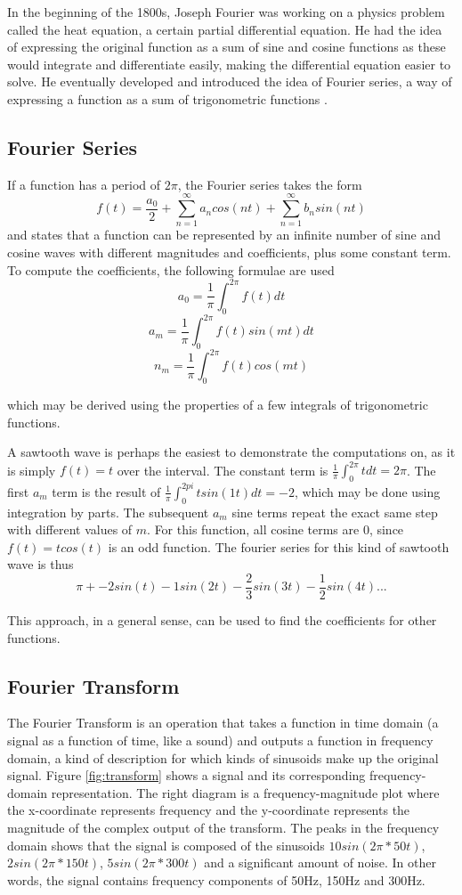 In the beginning of the 1800s, Joseph Fourier was working on a physics problem called the heat equation, a certain partial differential equation. He had the idea of expressing the original function as a sum of sine and cosine functions as these would integrate and differentiate easily, making the differential equation easier to solve. He eventually developed and introduced the idea of Fourier series, a way of expressing a function as a sum of trigonometric functions \cite{Bounchaleun2019}.

\subsection{Fourier Series} 
If a function has a period of $2\pi$, the Fourier series takes the form $$f(t) = \frac{a_0}{2} + \sum_{n=1}^{\infty}a_ncos(nt)+\sum_{n=1}^{\infty}b_nsin(nt)$$ and states that a function can be represented by an infinite number of sine and cosine waves with different magnitudes and coefficients, plus some constant term. To compute the coefficients, the following formulae are used
$$a_0 = \frac{1}{\pi}\int_0^{2\pi} f(t)dt$$
$$a_m = \frac{1}{\pi}\int_0^{2\pi} f(t) sin(mt)dt$$
$$n_m = \frac{1}{\pi}\int_0^{2\pi} f(t) cos(mt)$$

which may be derived using the properties of a few integrals of trigonometric functions.

A sawtooth wave is perhaps the easiest to demonstrate the computations on, as it is simply $f(t) = t$ over the interval. The constant term is $\frac{1}{\pi}\int_0^{2\pi} t dt = 2\pi$. The first $a_m$ term is the result of $\frac{1}{\pi}\int_0^{2pi} t sin(1t)dt = -2$, which may be done using integration by parts. The subsequent $a_m$ sine terms repeat the exact same step with different values of $m$. For this function, all cosine terms are 0, since $f(t)=tcos(t)$ is an odd function. The fourier series for this kind of sawtooth wave is thus
$$\pi + -2sin(t) -1sin(2t)-\frac{2}{3}sin(3t) - \frac{1}{2}sin(4t) ...$$

This approach, in a general sense, can be used to find the coefficients for other functions.
 

\subsection{Fourier Transform} 
The Fourier Transform is an operation that takes a function in time domain (a signal as a function of time, like a sound) and outputs a function in frequency domain, a kind of description for which kinds of sinusoids make up the original signal. Figure \ref{fig:transform} shows a signal and its corresponding frequency-domain representation. The right diagram is a frequency-magnitude plot where the x-coordinate represents frequency and the y-coordinate represents the magnitude of the complex output of the transform. The peaks in the frequency domain shows that the signal is composed of the sinusoids $10sin(2\pi * 50t)$, $2sin(2\pi * 150t)$, $5sin(2\pi * 300t)$ and a significant amount of noise. In other words, the signal contains frequency components of 50Hz, 150Hz and 300Hz. 

